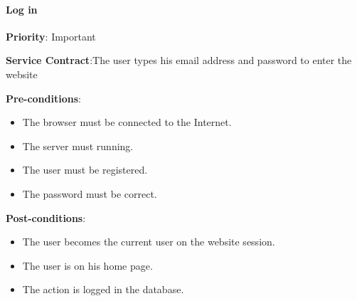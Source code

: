     	\paragraph{Log in}
			\begin{description}
			    \item{\textbf{Priority}:} Important
			    \item{\textbf{Service Contract}:}The user types his email address and password to enter the website
			    \item{\textbf{Pre-conditions}:}%
    			    \begin{itemize}
    			        \item The browser must be connected to the Internet.
    			        \item The server must running.
    			        \item The user must be registered.
    			        \item The password must be correct.
    			    \end{itemize}
			    \item{\textbf{Post-conditions}:}
    			    \begin{itemize}
    			    \item The user becomes the current user on the website session.%
    			    \item The user is on his home page.
    			    \item  The action is logged in the database.
    			    
    			    \end{itemize}
			\end{description}
			
